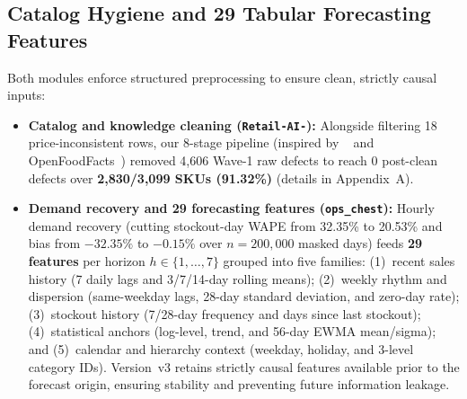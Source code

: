 \subsection*{Catalog Hygiene and 29 Tabular Forecasting Features}
Both modules enforce structured preprocessing to ensure clean, strictly causal inputs:
\begin{itemize}
    \item \textbf{Catalog and knowledge cleaning (\texttt{Retail-AI-}):} Alongside filtering 18 price-inconsistent rows, our 8-stage pipeline (inspired by ~\cite{hf_datatrove} and OpenFoodFacts~\cite{openfoodfacts}) removed 4,606 Wave-1 raw defects to reach 0 post-clean defects over \textbf{2,830/3,099 SKUs (91.32\%)} (details in Appendix~A).
    \item \textbf{Demand recovery and 29 forecasting features (\texttt{ops\_chest}):} Hourly demand recovery (cutting stockout-day WAPE from 32.35\% to 20.53\% and bias from $-32.35\%$ to $-0.15\%$ over $n=200{,}000$ masked days) feeds \textbf{29 features} per horizon $h \in \{1,\dots,7\}$ grouped into five families: (1)~recent sales history (7 daily lags and 3/7/14-day rolling means); (2)~weekly rhythm and dispersion (same-weekday lags, 28-day standard deviation, and zero-day rate); (3)~stockout history (7/28-day frequency and days since last stockout); (4)~statistical anchors (log-level, trend, and 56-day EWMA mean/sigma); and (5)~calendar and hierarchy context (weekday, holiday, and 3-level category IDs). Version~v3 retains strictly causal features available prior to the forecast origin, ensuring stability and preventing future information leakage.
\end{itemize}

